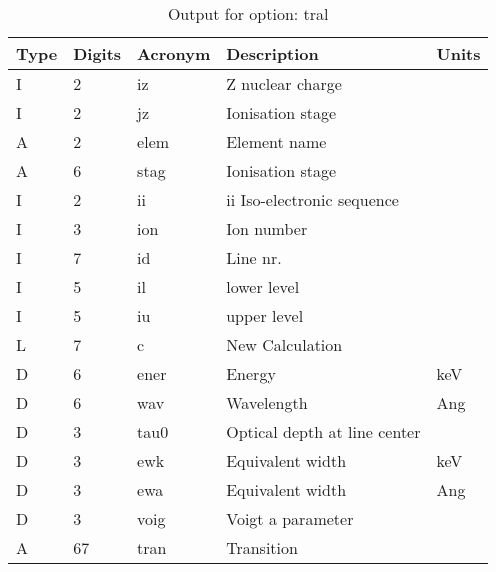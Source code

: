 \begin{table}[!p]
\caption{Output for option: tral}
\label{tabout:tral}
\begin{tabular}{lllll}
\hline
Type & Digits & Acronym & Description & Units \\ 
\hline
I &  2 & iz   & Z nuclear charge                 &                  \\
I &  2 & jz   & Ionisation stage                 &                  \\
A &  2 & elem & Element name                     &                  \\
A &  6 & stag & Ionisation stage                 &                  \\
I &  2 & ii   & ii Iso-electronic sequence       &                  \\
I &  3 & ion  & Ion number                       &                  \\
I &  7 & id   & Line nr.                         &                  \\
I &  5 & il   & lower level                      &                  \\
I &  5 & iu   & upper level                      &                  \\
L &  7 & c    & New Calculation                  &                  \\
D &  6 & ener & Energy                           & keV              \\
D &  6 & wav  & Wavelength                       & Ang              \\
D &  3 & tau0 & Optical depth at line center     &                  \\
D &  3 & ewk  & Equivalent width                 & keV              \\
D &  3 & ewa  & Equivalent width                 & Ang              \\
D &  3 & voig & Voigt a parameter                &                  \\
A & 67 & tran & Transition                       &                  \\
\hline
\end{tabular}
\end{table}

